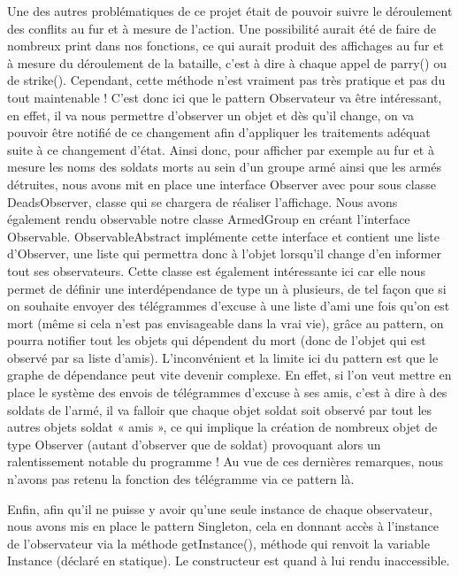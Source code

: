 Une des autres problématiques de ce projet était de pouvoir suivre le déroulement des conflits au fur et à mesure de l’action. Une possibilité aurait été de faire de nombreux print dans nos fonctions, ce qui aurait produit des affichages au fur et à mesure du déroulement de la bataille, c'est à dire à chaque appel de parry() ou de strike(). Cependant, cette méthode n'est vraiment pas très pratique et pas du tout maintenable ! 
C'est donc ici que le pattern Observateur va être intéressant, en effet, il va nous permettre d'observer un objet et dès qu'il change, on va pouvoir être notifié de ce changement afin d'appliquer les traitements adéquat suite à ce changement d'état. 
Ainsi donc, pour afficher par exemple au fur et à mesure les noms des soldats morts au sein d'un groupe armé ainsi que les armés détruites, nous avons mit en place une interface Observer avec pour sous classe DeadsObserver, classe qui se chargera de réaliser l'affichage. Nous avons également rendu observable notre classe ArmedGroup en créant l'interface Observable. ObservableAbstract implémente cette interface et contient une liste d'Observer, une liste qui permettra donc à l'objet lorsqu'il change d'en informer tout ses observateurs. 
Cette classe est également intéressante ici car elle nous permet de définir une interdépendance de type un à plusieurs, de tel façon que si on souhaite envoyer des télégrammes d’excuse à une liste d'ami une fois qu'on est mort (même si cela n'est pas envisageable dans la vrai vie), grâce au pattern, on pourra notifier tout les objets qui dépendent du mort (donc de l'objet qui est observé par sa liste d'amis). L'inconvénient et la limite ici du pattern est que le graphe de dépendance peut vite devenir complexe. En effet, si l'on veut mettre en place le système des envois de télégrammes d’excuse à ses amis, c'est à dire à des soldats de l'armé, il va falloir que chaque objet soldat soit observé par tout les autres objets soldat « amis », ce qui implique la création de nombreux objet de type Observer (autant d'observer que de soldat) provoquant alors un ralentissement notable du programme ! Au vue de ces dernières remarques, nous n'avons pas retenu la fonction des télégramme via ce pattern là.



Enfin, afin qu’il ne puisse y avoir qu'une seule instance de chaque observateur, nous avons mis en place le pattern Singleton, cela en donnant accès à l'instance de l'observateur via la méthode getInstance(), méthode qui renvoit la variable Instance  (déclaré en statique). Le constructeur est quand à lui rendu inaccessible.



